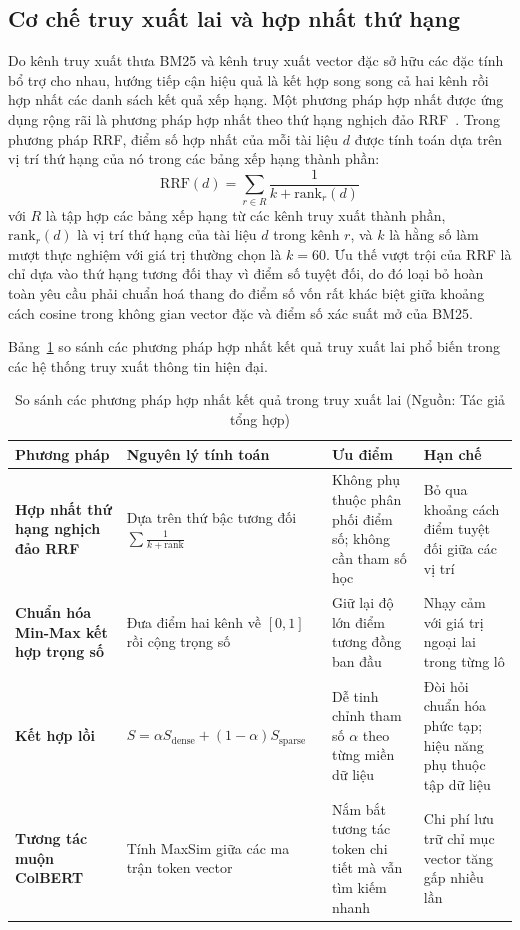 \subsection{Cơ chế truy xuất lai và hợp nhất thứ hạng}
Do kênh truy xuất thưa BM25 và kênh truy xuất vector đặc sở hữu các đặc tính bổ trợ cho nhau, hướng tiếp cận hiệu quả là kết hợp song song cả hai kênh rồi hợp nhất các danh sách kết quả xếp hạng. Một phương pháp hợp nhất được ứng dụng rộng rãi là phương pháp hợp nhất theo thứ hạng nghịch đảo RRF~\cite{cormack2009reciprocal}. Trong phương pháp RRF, điểm số hợp nhất của mỗi tài liệu $d$ được tính toán dựa trên vị trí thứ hạng của nó trong các bảng xếp hạng thành phần:
\begin{equation}
\mathrm{RRF}(d) = \sum_{r \in R} \frac{1}{k + \mathrm{rank}_r(d)}
\end{equation}
với $R$ là tập hợp các bảng xếp hạng từ các kênh truy xuất thành phần, $\mathrm{rank}_r(d)$ là vị trí thứ hạng của tài liệu $d$ trong kênh $r$, và $k$ là hằng số làm mượt thực nghiệm với giá trị thường chọn là $k = 60$. Ưu thế vượt trội của RRF là chỉ dựa vào thứ hạng tương đối thay vì điểm số tuyệt đối, do đó loại bỏ hoàn toàn yêu cầu phải chuẩn hoá thang đo điểm số vốn rất khác biệt giữa khoảng cách cosine trong không gian vector đặc và điểm số xác suất mở của BM25.

Bảng~\ref{tab:so_sanh_fusion} so sánh các phương pháp hợp nhất kết quả truy xuất lai phổ biến trong các hệ thống truy xuất thông tin hiện đại.

\begin{table}[H]
\centering
\caption{So sánh các phương pháp hợp nhất kết quả trong truy xuất lai (Nguồn: Tác giả tổng hợp)}
\label{tab:so_sanh_fusion}
\small
\begin{tabularx}{\textwidth}{>{\raggedright\arraybackslash\bfseries}p{3.0cm} >{\raggedright\arraybackslash}X >{\raggedright\arraybackslash}X >{\raggedright\arraybackslash}X}
\toprule
\textbf{Phương pháp} & \textbf{Nguyên lý tính toán} & \textbf{Ưu điểm} & \textbf{Hạn chế} \\
\midrule
Hợp nhất thứ hạng nghịch đảo RRF & Dựa trên thứ bậc tương đối $\sum \frac{1}{k + \mathrm{rank}}$ & Không phụ thuộc phân phối điểm số; không cần tham số học & Bỏ qua khoảng cách điểm tuyệt đối giữa các vị trí \\
Chuẩn hóa Min-Max kết hợp trọng số & Đưa điểm hai kênh về $[0, 1]$ rồi cộng trọng số & Giữ lại độ lớn điểm tương đồng ban đầu & Nhạy cảm với giá trị ngoại lai trong từng lô \\
Kết hợp lồi & $S = \alpha S_{\text{dense}} + (1-\alpha) S_{\text{sparse}}$ & Dễ tinh chỉnh tham số $\alpha$ theo từng miền dữ liệu & Đòi hỏi chuẩn hóa phức tạp; hiệu năng phụ thuộc tập dữ liệu \\
Tương tác muộn ColBERT~\cite{khattab2020colbert} & Tính MaxSim giữa các ma trận token vector & Nắm bắt tương tác token chi tiết mà vẫn tìm kiếm nhanh & Chi phí lưu trữ chỉ mục vector tăng gấp nhiều lần \\
\bottomrule
\end{tabularx}
\end{table}

